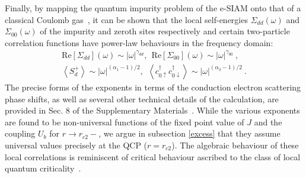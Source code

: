 \documentclass{iopart}
\begin{document}
Finally, by mapping the quantum impurity problem of the e-SIAM onto that of a classical Coulomb gas~\cite{anderson1969exact,si_kotliar_1993}, it can be shown that the local self-energies \(\Sigma_{dd}(\omega)\) and \(\Sigma_{00}(\omega)\) of the impurity and zeroth sites respectively and certain two-particle correlation functions have power-law behaviours in the frequency domain:
\begin{eqnarray}\label{exponents}
	\text{Re}\left[\Sigma_{dd}\right](\omega) \sim |\omega|^{\gamma_{dd}}, ~ ~\text{Re}\left[\Sigma_{00}\right](\omega) \sim |\omega|^{\gamma_{00}}~,\\
\left<S_d^+\right> \sim |\omega|^{(\alpha_1 - 1)/2}, ~ ~\left<c^\dagger_{0 \uparrow} c^\dagger_{ 0\downarrow}\right> \sim |\omega|^{(\alpha_3 - 1)/2}~.
\end{eqnarray}
The precise forms of the exponents in terms of the conduction electron scattering phase shifts, as well as several other technical details of the calculation, are provided in Sec. 8 of the Supplementary Materials~\cite{supp_mat}. While the various exponents are found to be non-universal functions of the fixed point value of $J$ and the coupling $U_{b}$ for $r\to r_{c2}-$, we argue in subsection \eqref{excess} that they assume universal values precisely at the QCP ($r=r_{c2}$). The algebraic behaviour of these local correlations
is reminiscent of critical behaviour ascribed to the class of local quantum criticality~\cite{Coleman_Si_2001,Si2001}. 
\end{document}
